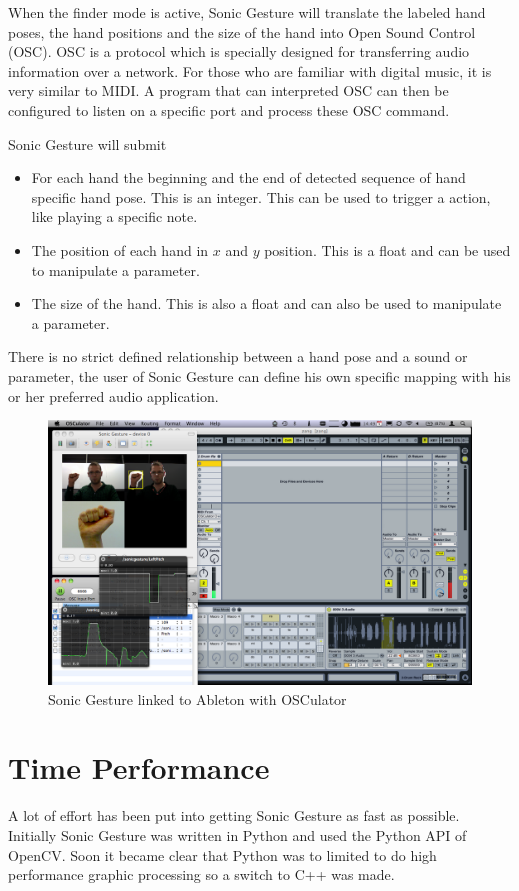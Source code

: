 When the finder mode is active, Sonic Gesture will translate the labeled hand poses, the hand positions and the size of the hand into Open Sound Control (OSC). OSC is a protocol which is specially designed for transferring audio information over a network. For those who are familiar with digital music, it is very similar to MIDI. A program that can interpreted OSC can then be configured to listen on a specific port and process these OSC command.

Sonic Gesture will submit
\begin{itemize}
	\item For each hand the beginning and the end of detected sequence of hand specific hand pose. This is an integer. This can be used to trigger a action, like playing a specific note.
	\item The position of each hand in $x$ and $y$ position. This is a float and can be used to manipulate a parameter.
	\item The size of the hand. This is also a float and can also be used to manipulate a parameter.
\end{itemize}

There is no strict defined relationship between a hand pose and a sound or parameter, the user of Sonic Gesture can define his own specific mapping with his or her preferred audio application. 

\begin{figure}[ht]
\centering{}
\includegraphics[width=0.9\linewidth]{figures/sonicableton.png}
\caption{Sonic Gesture linked to Ableton with OSCulator}
\label{fig:sonicableton}
\end{figure}

\section{Time Performance}
A lot of effort has been put into getting Sonic Gesture as fast as possible. Initially Sonic Gesture was written in Python and used the Python API of OpenCV. Soon it became clear that Python was to limited to do high performance graphic processing so a switch to C++ was made. 

